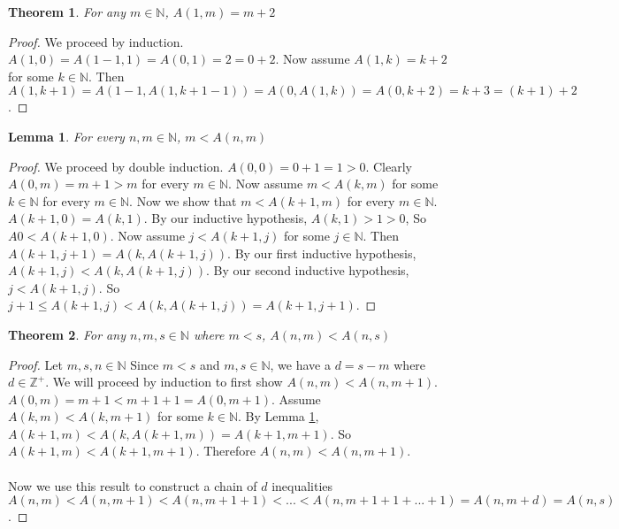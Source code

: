 \documentclass[12pt, letterpaper]{article}
\newtheorem{theorem}{Theorem}
\newtheorem{lemma}{Lemma}
\theoremstyle{case}
\begin{document}
    \begin{theorem}
      \label{x+2=A(1,x)}
      For any $m \in \mathbb{N}$, $A(1, m) = m + 2$
    \end{theorem}
    \begin{proof}
      We proceed by induction. \\
      $A(1, 0) = A(1 - 1, 1) = A(0, 1) = 2 = 0 + 2$. Now assume $A(1, k) = k + 2$ for some $k \in \mathbb{N}$.
      Then $A(1, k + 1) = A(1 - 1, A(1, k + 1 - 1)) = A(0, A(1, k)) = A(0, k + 2) = k + 3 = (k + 1) + 2$.
    \end{proof}

    \begin{lemma}
      \label{m<A(n,m)}
      For every $n, m \in \mathbb{N}$, $m < A(n, m)$
    \end{lemma}
    \begin{proof}
      We proceed by double induction.
      $A(0, 0) = 0 + 1 = 1 > 0$.
      Clearly $A(0, m) = m + 1 > m$ for every $m \in \mathbb{N}$.
      Now assume $m < A(k, m)$ for some $k \in \mathbb{N}$ for every $m \in \mathbb{N}$.
      Now we show that $m < A(k + 1, m)$ for every $m \in \mathbb{N}$.
      $A(k + 1, 0) = A(k, 1)$. By our inductive hypothesis, $A(k, 1) > 1 > 0$,
      So $A0 < A(k + 1, 0)$.
      Now assume $j < A(k + 1, j)$ for some $j \in \mathbb{N}$.
      Then $A(k + 1, j + 1) = A(k, A(k + 1, j))$.
      By our first inductive hypothesis, $A(k + 1, j) < A(k, A(k + 1, j))$.
      By our second inductive hypothesis, $j < A(k + 1, j)$.
      So $j + 1 \leq A(k + 1, j) < A(k, A(k + 1, j)) = A(k + 1, j + 1)$.
    \end{proof}

    \begin{theorem}
      \label{a(n,m)<a(n,s)}
      For any $n, m, s \in \mathbb{N}$ where $m < s$, $A(n, m) < A(n, s)$
    \end{theorem}
    \begin{proof}
      Let $m, s, n \in \mathbb{N}$
      Since $m < s$ and $m, s \in \mathbb{N}$, we have a $d = s - m$ where $d \in \mathbb{Z}^+$.
      We will proceed by induction to first show $A(n, m) < A(n, m + 1)$.
      $A(0, m) = m + 1 < m + 1 + 1 = A(0, m + 1)$.
      Assume $A(k, m) < A(k, m + 1)$ for some $k \in \mathbb{N}$.
      By Lemma \ref{m<A(n,m)}, $A(k + 1, m) < A(k, A(k + 1, m)) = A(k + 1, m + 1)$.
      So $A(k + 1, m) < A(k + 1, m + 1)$.
      Therefore $A(n, m) < A(n, m + 1)$.
      \\
      \\
      Now we use this result to construct a chain of $d$ inequalities $A(n, m) < A(n, m + 1) < A(n, m + 1 + 1) < ... < A(n, m + 1 + 1 + ... + 1)
      = A(n, m + d) = A(n, s)$. 
    \end{proof}
\end{document}
